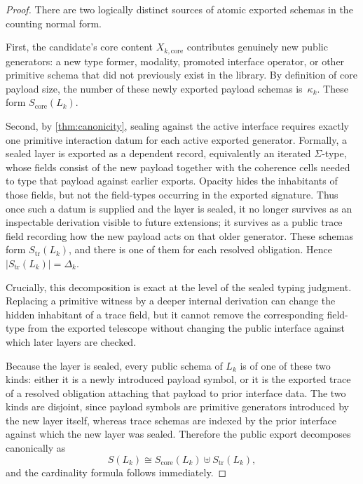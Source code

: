 \documentclass{lmcs}
\begin{document}
\begin{proof}
There are two logically distinct sources of atomic exported schemas in the counting normal form.

First, the candidate's core content $X_{k,\mathrm{core}}$ contributes genuinely new public generators: a new type former, modality, promoted interface operator, or other primitive schema that did not previously exist in the library. By definition of core payload size, the number of these newly exported payload schemas is~$\kappa_k$. These form $S_{\mathrm{core}}(L_k)$.

Second, by \autoref{thm:canonicity}, sealing against the active interface requires exactly one primitive interaction datum for each active exported generator. Formally, a sealed layer is exported as a dependent record, equivalently an iterated $\Sigma$-type, whose fields consist of the new payload together with the coherence cells needed to type that payload against earlier exports. Opacity hides the inhabitants of those fields, but not the field-types occurring in the exported signature. Thus once such a datum is supplied and the layer is sealed, it no longer survives as an inspectable derivation visible to future extensions; it survives as a public trace field recording how the new payload acts on that older generator. These schemas form $S_{\mathrm{tr}}(L_k)$, and there is one of them for each resolved obligation. Hence $|S_{\mathrm{tr}}(L_k)|=\Delta_k$.

Crucially, this decomposition is exact at the level of the sealed typing judgment. Replacing a primitive witness by a deeper internal derivation can change the hidden inhabitant of a trace field, but it cannot remove the corresponding field-type from the exported telescope without changing the public interface against which later layers are checked.

Because the layer is sealed, every public schema of $L_k$ is of one of these two kinds: either it is a newly introduced payload symbol, or it is the exported trace of a resolved obligation attaching that payload to prior interface data. The two kinds are disjoint, since payload symbols are primitive generators introduced by the new layer itself, whereas trace schemas are indexed by the prior interface against which the new layer was sealed. Therefore the public export decomposes canonically as
\[
  S(L_k) \cong S_{\mathrm{core}}(L_k) \uplus S_{\mathrm{tr}}(L_k),
\]
and the cardinality formula follows immediately.
\end{proof}
\end{document}
